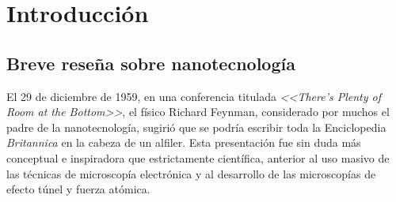  \newcommand{\NoBiblioIntro}[1]{
 \ifthenelse{\equal{#1}{verdadero}}{}{}
 \NoBiblioIntro{verdadero}}


 \FormatoCapituloUnaLinea

 \chapter{Introducción}\label{chap:Introduccion}

 \thispagestyle{empty}
	

 
 \vfill
 \minitoc
 \newpage

\section{Breve reseña sobre nanotecnología}

	 El 29 de diciembre de 1959, en una conferencia titulada \textit{<<There's Plenty of Room at the Bottom>>}, el físico Richard Feynman, considerado por muchos el padre de la nanotecnología, sugirió que se podría escribir toda la Enciclopedia \textit{Britannica} en la cabeza de un alfiler.\cite{Feynman1959} Esta presentación fue sin duda más conceptual e inspiradora que estrictamente científica, anterior al uso masivo de las técnicas de microscopía electrónica y al desarrollo de las microscopías de efecto túnel y fuerza atómica.  

